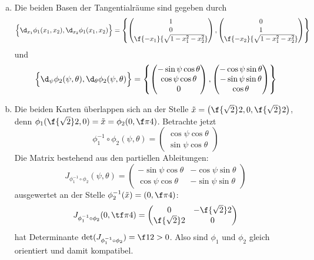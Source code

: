 \documentclass{mywork}
\begin{document}
	\begin{aufgabe}~

		\begin{enumerate}[a)]
			\item
				Die beiden Basen der Tangentialräume sind gegeben durch
				\[
					\Big\{ \d_{x_1} \phi_1(x_1,x_2), \d_{x_2} \phi_1(x_1,x_2) \Big\}
					= \left\{ \begin{pmatrix}
						1 \\ 0 \\ \f{-x_1}{\sqrt{1-x_1^2 -x_2^2}}
					\end{pmatrix}, \begin{pmatrix}
						0 \\ 1 \\ \f{-x_2}{\sqrt{1-x_1^2 -x_2^2}}
					\end{pmatrix} \right\}
				\]
				und
				\[
					\Big\{ \d_{\psi} \phi_2(\psi,\theta), \d_{\theta} \phi_2(\psi,\theta) \Big\}
					= \left\{ \begin{pmatrix}
							-\sin \psi \cos \theta \\ \cos \psi \cos \theta \\ 0
					\end{pmatrix}, \begin{pmatrix}
						-\cos \psi \sin \theta \\ -\sin \psi \sin \theta \\ \cos \theta
					\end{pmatrix} \right\}
				\]
			\item
				Die beiden Karten überlappen sich an der Stelle $\tilde x = \big(\f{\sqrt 2}2, 0, \f{\sqrt 2}2\big)$, denn $\phi_1(\f{\sqrt 2}2, 0) = \tilde x = \phi_2(0, \f \pi 4)$.
				Betrachte jetzt
				\[
					\phi_1^{-1} \circ \phi_2 (\psi, \theta) = \begin{pmatrix}
						\cos \psi \cos \theta \\
						\sin \psi \cos \theta
					\end{pmatrix}
				\]
				Die Matrix bestehend aus den partiellen Ableitungen:
				\[
					J_{\phi_1^{-1}\circ \phi_2} (\psi, \theta) = \begin{pmatrix}
						-\sin \psi \cos \theta & -\cos \psi  \sin \theta \\
						\cos \psi \cos \theta & -\sin \psi \sin \theta
					\end{pmatrix}
				\]
				ausgewertet an der Stelle $\phi_2^{-1}(\tilde x) = (0, \f \pi 4)$:
				\[
					J_{\phi_1^{-1}\circ \phi_2} (0, \tf \pi 4) = \begin{pmatrix}
						0 & -\f {\sqrt 2}2 \\
						\f {\sqrt 2}2 & 0
					\end{pmatrix}
				\]
				hat Determinante $\det(J_{\phi_1^{-1}\circ \phi_2}) = \f 12 > 0$.
				Also sind $\phi_1$ und $\phi_2$ gleich orientiert und damit kompatibel.


\end{enumerate}
\end{aufgabe}
\end{document}
